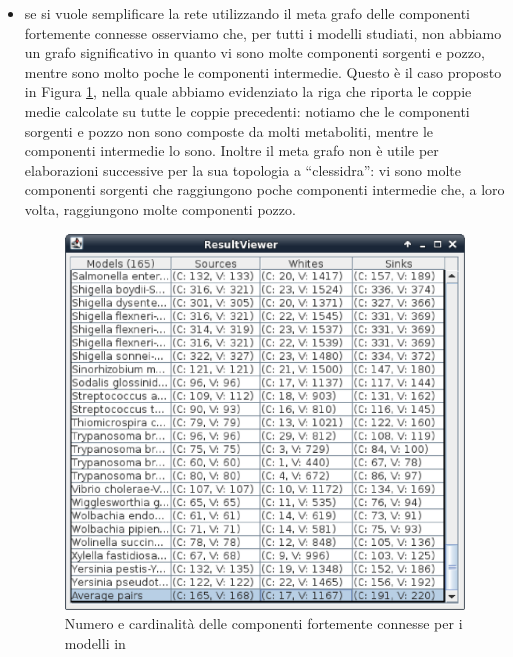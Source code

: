 \begin{itemize}
\item se si vuole semplificare la rete utilizzando il meta grafo delle
  componenti fortemente connesse osserviamo che, per tutti i modelli
  studiati, non abbiamo un grafo significativo in quanto vi sono molte
  componenti sorgenti e pozzo, mentre sono molto poche le componenti
  intermedie. Questo \`e il caso proposto in Figura
  \ref{fig:ResultViewer-SCC-composition}, nella quale abbiamo
  evidenziato la riga che riporta le coppie medie calcolate su tutte
  le coppie precedenti: notiamo che le componenti sorgenti e pozzo non
  sono composte da molti metaboliti, mentre le componenti intermedie
  lo sono. Inoltre il meta grafo non \`e utile per elaborazioni
  successive per la sua topologia a ``clessidra'': vi sono molte
  componenti sorgenti che raggiungono poche componenti intermedie che,
  a loro volta, raggiungono molte componenti pozzo.
  \begin{figure}
    \centering
    \includegraphics[scale=.7]{images/ResultViewer-table-with-average-row-selected}
    \caption{Numero e cardinalit\`a delle componenti fortemente connesse per i modelli in \cite{MetExplore}}
    \label{fig:ResultViewer-SCC-composition}
  \end{figure}
\end{itemize}
